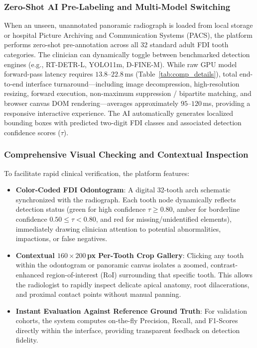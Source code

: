 \documentclass[10pt,journal,compsoc]{IEEEtran}
\begin{document}
\subsubsection{Zero-Shot AI Pre-Labeling and Multi-Model Switching}
When an unseen, unannotated panoramic radiograph is loaded from local storage or hospital Picture Archiving and Communication Systems (PACS), the platform performs zero-shot pre-annotation across all 32 standard adult FDI tooth categories. The clinician can dynamically toggle between benchmarked detection engines (e.g., RT-DETR-L, YOLO11m, D-FINE-M). While raw GPU model forward-pass latency requires $13.8\text{--}22.8$\,ms (Table~\ref{tab:comp_details}), total end-to-end interface turnaround—including image decompression, high-resolution resizing, forward execution, non-maximum suppression / bipartite matching, and browser canvas DOM rendering—averages approximately $95\text{--}120$\,ms, providing a responsive interactive experience. The AI automatically generates localized bounding boxes with predicted two-digit FDI classes and associated detection confidence scores ($\tau$).

\subsubsection{Comprehensive Visual Checking and Contextual Inspection}
To facilitate rapid clinical verification, the platform features:
\begin{itemize}
    \item \textbf{Color-Coded FDI Odontogram}: A digital 32-tooth arch schematic synchronized with the radiograph. Each tooth node dynamically reflects detection status (green for high confidence $\tau \ge 0.80$, amber for borderline confidence $0.50 \le \tau < 0.80$, and red for missing/unidentified elements), immediately drawing clinician attention to potential abnormalities, impactions, or false negatives.
    \item \textbf{Contextual $160 \times 200$\,px Per-Tooth Crop Gallery}: Clicking any tooth within the odontogram or panoramic canvas isolates a zoomed, contrast-enhanced region-of-interest (RoI) surrounding that specific tooth. This allows the radiologist to rapidly inspect delicate apical anatomy, root dilacerations, and proximal contact points without manual panning.
    \item \textbf{Instant Evaluation Against Reference Ground Truth}: For validation cohorts, the system computes on-the-fly Precision, Recall, and F1-Scores directly within the interface, providing transparent feedback on detection fidelity.
\end{itemize}
\end{document}
